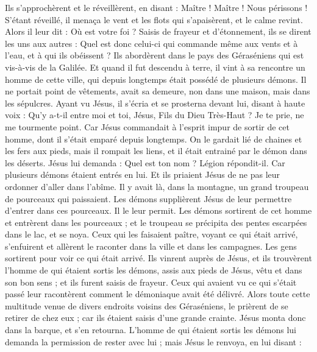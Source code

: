 \begin{multicols}{2}
{Ils s’approchèrent et le réveillèrent, en disant : Maître ! Maître ! Nous périssons ! S’étant réveillé, il menaça le vent et les flots qui s'apaisèrent, et le calme revint.
Alors il leur dit : Où est votre foi ? Saisis de frayeur et d’étonnement, ils se dirent les uns aux autres : Quel est donc celui-ci qui commande même aux vents et à l'eau, et à qui ils obéissent ?
Ils abordèrent dans le pays des Géraséniens qui est vis-à-vis de la Galilée.
Et quand il fut descendu à terre, il vint à sa rencontre un homme de cette ville, qui depuis longtemps était possédé de plusieurs démons. Il ne portait point de vêtements, avait sa demeure, non dans une maison, mais dans les sépulcres.
Ayant vu Jésus, il s'écria et se prosterna devant lui, disant à haute voix : Qu'y a-t-il entre moi et toi, Jésus, Fils du Dieu Très-Haut ? Je te prie, ne me tourmente point.
Car Jésus commandait à l'esprit impur de sortir de cet homme, dont il s’était emparé depuis longtemps. On le gardait lié de chaines et les fers aux pieds, mais il rompait les liens, et il était entrainé par le démon dans les déserts.
Jésus lui demanda : Quel est ton nom ? Légion répondit-il. Car plusieurs démons étaient entrés en lui.
Et ils priaient Jésus de ne pas leur ordonner d’aller dans l'abîme.
Il y avait là, dans la montagne, un grand troupeau de pourceaux qui paissaient. Les démons supplièrent Jésus de leur permettre d'entrer dans ces pourceaux. Il le leur permit.
Les démons sortirent de cet homme et entrèrent dans les pourceaux ; et le troupeau se précipita des pentes escarpées dans le lac, et se noya.
Ceux qui les faisaient paître, voyant ce qui était arrivé, s'enfuirent et allèrent le raconter dans la ville et dans les campagnes.
Les gens sortirent pour voir ce qui était arrivé. Ils vinrent auprès de Jésus, et ils trouvèrent l'homme de qui étaient sortis les démons, assis aux pieds de Jésus, vêtu et dans son bon sens ; et ils furent saisis de frayeur.
Ceux qui avaient vu ce qui s’était passé leur racontèrent comment le démoniaque avait été délivré.
Alors toute cette multitude venue de divers endroits voisins des Géraséniens, le prièrent de se retirer de chez eux ; car ils étaient saisis d'une grande crainte. Jésus monta donc dans la barque, et s'en retourna.
L'homme de qui étaient sortis les démons lui demanda la permission de rester avec lui ; mais Jésus le renvoya, en lui disant :
}
\end{multicols}
